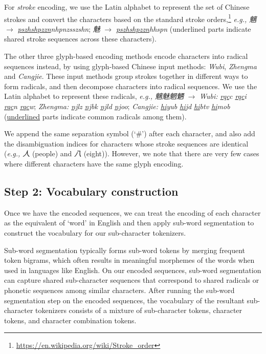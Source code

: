 
For \textit{stroke} encoding, we use the Latin alphabet to represent the set of Chinese strokes and convert the characters based on the standard stroke orders,\footnote{\url{https://en.wikipedia.org/wiki/Stroke_order}} \textit{e.g., 魑} $\rightarrow$ \textit{\underline{pszhshpzzn}nhpnzsszshn}; \textit{魅} $\rightarrow$ \textit{\underline{pszhshpzzn}hhspn} (underlined parts indicate shared stroke sequences across these characters). 

The other three glyph-based encoding methods encode characters into radical sequences instead,
by using glyph-based Chinese input methods: \textit{Wubi}, \textit{Zhengma} and \textit{Cangjie}. These input methods group strokes together in different ways to form radicals, and then decompose characters into radical sequences. We use the Latin alphabet to represent these radicals, \textit{e.g., 魑魅魍魉} $\rightarrow$ \textit{Wubi: \underline{rqc}c \underline{rqc}i \underline{rqc}n \underline{rqc}w}; \textit{Zhengma: \underline{nj}lz \underline{nj}bk \underline{nj}ld \underline{nj}oo}; \textit{Cangjie: \underline{hi}yub \underline{hi}jd \underline{hi}btv \underline{hi}mob} (\underline{underlined} parts indicate common radicals among them).

We append the same separation symbol (`\#') after each character, and also add the disambiguation indices for characters whose stroke sequences are identical (\textit{e.g., 人} (people) and \textit{八} (eight)). However, we note that there are very few cases where different characters have the same glyph encoding.





\subsection{Step 2: Vocabulary construction}

Once we have the encoded sequences, we can treat the encoding of each character as the equivalent of `word' in English and then apply sub-word segmentation to construct the vocabulary for our sub-character tokenizers. 

Sub-word segmentation typically forms sub-word tokens by merging frequent token bigrams, which often results in meaningful morphemes of the words when used in languages like English. On our encoded sequences, sub-word segmentation can capture shared sub-character sequences that correspond to shared radicals or phonetic sequences among similar characters. 
After running the sub-word segmentation step on the encoded sequences, the vocabulary of the resultant sub-character tokenizers consists of a mixture of sub-character tokens, character tokens, and character combination tokens. 

